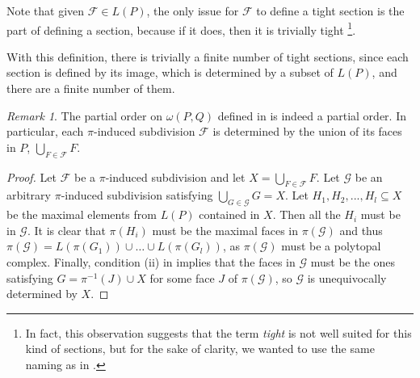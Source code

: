 \documentclass[10pt,a4paper]{article}
\theoremstyle{plain}
\theoremstyle{remark}
\newtheorem{remark}{Remark}
\theoremstyle{definition}
\begin{document}
Note that given $\mathcal F\in L(P)$, the only issue for $\mathcal F$ to 
define a tight section is the part of defining a section, 
because if it does, then it is trivially tight
\footnote{In fact, this observation suggests that the term \textit{tight} is not
	well suited for this kind of sections, but for the sake of clarity, 
	we wanted to use the same naming as in \cite{ziegler2012lectures}.}. 


With this definition, there is trivially a finite number of tight sections,
since each section is defined by its image, 
which is determined by a subset of $L(P)$,
and there are a finite number of them.

\begin{remark} 
	The partial order on $\omega(P,Q)$ 
	defined in \cite[Sec. 9.1]{ziegler2012lectures} 
	is indeed a partial order. 
	In particular, 
	each $\pi$-induced subdivision $\mathcal{F}$ is determined by the union of its faces in $P$, 
	$\bigcup_{F\in \mathcal{F}} F$.
\end{remark}
\begin{proof}
	Let $\mathcal{F}$ be a $\pi$-induced subdivision and let 
	$X= \bigcup_{F\in \mathcal{F}} F$. 
	Let $\mathcal{G}$ be an arbitrary $\pi$-induced subdivision 
	satisfying $ \bigcup_{G\in \mathcal{G}} G=X$. 
	Let $H_1, H_2,...,H_l \subseteq X$ be the maximal elements from $L(P)$ contained in $X$. 
	Then all the $H_i$ must be in $\mathcal{G}$. 
	It is clear that $\pi(H_i)$ must be the maximal faces in $\pi(\mathcal{G})$ 
	and thus $\pi(\mathcal{G})= L(\pi(G_1))\cup \dots \cup L(\pi(G_l))$, 
	as $\pi(\mathcal{G})$ must be a polytopal complex. 
	Finally, condition (ii) in \cite[Def. 9.1]{ziegler2012lectures} 
	implies that the faces in $\mathcal{G}$ must be the ones satisfying 
	$G=\pi^{-1}(J)\cup X$ for some face $J$ of $\pi(\mathcal{G})$, 
	so $\mathcal{G}$ is unequivocally determined by $X$.  
\end{proof}

\end{document}
